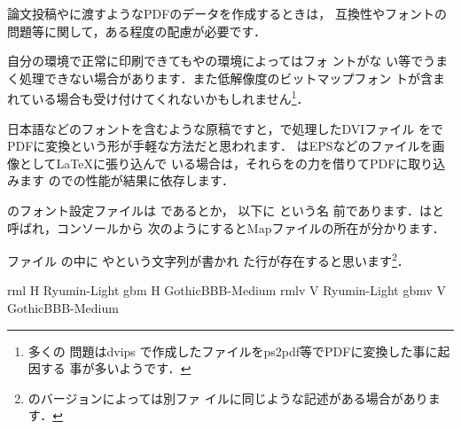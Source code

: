 論文投稿やに渡すようなPDFのデータを作成するときは，
互換性やフォントの問題等に関して，ある程度の配慮が必要です．

自分の環境で正常に印刷できてもやの環境によってはフォ
ントがな%
い等でうまく処理できない場合があります．また低解像度のビットマップフォン
トが含まれている場合も受け付けてくれないかもしれません\footnote{多くの
問題はdvips で作成した\PS ファイルをps2pdf等でPDFに変換した事に起因する
事が多いようです．}．

日本語などのフォントを含むような原稿ですと，{\pLaTeX}で処理したDVIファイル
を\prog{\Dvipdfmx}でPDFに変換という形が手軽な方法だと思われます．
\prog{\Dvipdfmx}はEPSなどの{\PS}ファイルを画像として{\LaTeX}に張り込んで
いる場合は，それらを\Prog[Ghostscript]{\GS}の力を借りてPDFに取り込みます
のでの性能が結果に依存します．%

%
%
\Dvipdfmx のフォント設定ファイルは 
であるとか， 以下に  という名
前であります．は{}と呼ばれ，コンソールから
次のようにするとMapファイルの所在が分かります．

\begin{InTerm}
\end{InTerm}


ファイル  の中に やという文字列が書かれ
た行が存在すると思います\footnote{\Dvipdfmx のバージョンによっては別ファ
イルに同じような記述がある場合があります．}．

%
%
%
%
%
%
%
%
\begin{plainfile}
rml  H Ryumin-Light
gbm  H GothicBBB-Medium
rmlv V Ryumin-Light
gbmv V GothicBBB-Medium 
\end{plainfile}

